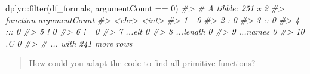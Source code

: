 \documentclass[
]{book}
\newenvironment{Shaded}{\begin{snugshade}}{\end{snugshade}}
\newcommand{\CommentTok}[1]{\textcolor[rgb]{0.56,0.35,0.01}{\textit{#1}}}
\newcommand{\DecValTok}[1]{\textcolor[rgb]{0.00,0.00,0.81}{#1}}
\newcommand{\FunctionTok}[1]{\textcolor[rgb]{0.00,0.00,0.00}{#1}}
\newcommand{\NormalTok}[1]{#1}
\newcommand{\SpecialCharTok}[1]{\textcolor[rgb]{0.00,0.00,0.00}{#1}}
\begin{document}
\begin{Shaded}
\begin{Highlighting}[]
\NormalTok{dplyr}\SpecialCharTok{::}\FunctionTok{filter}\NormalTok{(df\_formals, argumentCount }\SpecialCharTok{==} \DecValTok{0}\NormalTok{)}
\CommentTok{\#\textgreater{} \# A tibble: 251 x 2}
\CommentTok{\#\textgreater{}    \textasciigrave{}function\textasciigrave{} argumentCount}
\CommentTok{\#\textgreater{}    \textless{}chr\textgreater{}              \textless{}int\textgreater{}}
\CommentTok{\#\textgreater{}  1 {-}                      0}
\CommentTok{\#\textgreater{}  2 :                      0}
\CommentTok{\#\textgreater{}  3 ::                     0}
\CommentTok{\#\textgreater{}  4 :::                    0}
\CommentTok{\#\textgreater{}  5 !                      0}
\CommentTok{\#\textgreater{}  6 !=                     0}
\CommentTok{\#\textgreater{}  7 ...elt                 0}
\CommentTok{\#\textgreater{}  8 ...length              0}
\CommentTok{\#\textgreater{}  9 ...names               0}
\CommentTok{\#\textgreater{} 10 .C                     0}
\CommentTok{\#\textgreater{} \# ... with 241 more rows}
\end{Highlighting}
\end{Shaded}

\begin{quote}
How could you adapt the code to find all primitive functions?
\end{quote}
\end{document}

